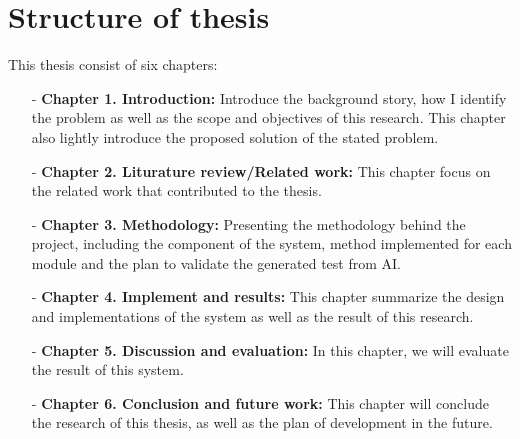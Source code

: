 \section{Structure of thesis}
This thesis consist of six chapters:
\begin{itemize}
	\item[-] \textbf{Chapter 1. Introduction:} Introduce the background story, how I identify the problem as well as the scope and objectives of this research. This chapter also lightly introduce the proposed solution of the stated problem.
	\item[-] \textbf{Chapter 2. Liturature review/Related work:} This chapter focus on the related work that contributed to the thesis.
	\item[-] \textbf{Chapter 3. Methodology:} Presenting the methodology behind the project, including the component of the system, method implemented for each module and the plan to validate the generated test from AI.
	\item[-] \textbf{Chapter 4. Implement and results:} This chapter summarize the design and implementations of the system as well as the result of this research.
	\item[-] \textbf{Chapter 5. Discussion and evaluation:} In this chapter, we will evaluate the result of this system.
	\item[-] \textbf{Chapter 6. Conclusion and future work:} This chapter will conclude the research of this thesis, as well as the plan of development in the future. 
\end{itemize}